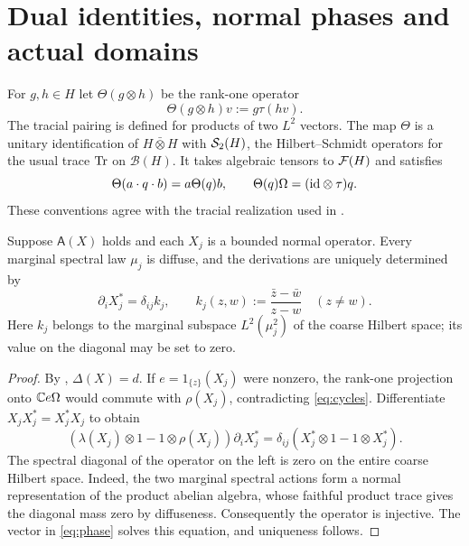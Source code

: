 \section{Dual identities, normal phases and actual domains}\label{sec:duals}
For $g,h\in H$ let $\Theta(g\otimes h)$ be the rank-one operator
\[
 \Theta(g\otimes h)v:=g\tau(hv).
\]
The tracial pairing is defined for products of two $L^2$ vectors.
The map $\Theta$ is a unitary identification of $H\bar\otimes H$ with $\mathcal S_2(H)$, the Hilbert--Schmidt operators for the usual trace $\operatorname{Tr}$ on $\mathcal B(H)$.
It takes algebraic tensors to $\mathcal F(H)$ and satisfies
\begin{equation}\label{eq:theta}
 \Theta(a\cdot q\cdot b)=a\Theta(q)b,\qquad
 \Theta(q)\Omega=(\mathrm{id}\otimes\tau)q.
\end{equation}
These conventions agree with the tracial realization used in \cite{Voi98,ACSY24}.

\begin{lemma}\label{lem:phase}
Suppose $\mathsf A(X)$ holds and each $X_j$ is a bounded normal operator.
Every marginal spectral law $\mu_j$ is diffuse, and the derivations are uniquely determined by
\begin{equation}\label{eq:phase}
 \partial_iX_j^*=\delta_{ij}k_j,\qquad
 k_j(z,w):=\frac{\bar z-\bar w}{z-w}\quad(z\ne w).
\end{equation}
Here $k_j$ belongs to the marginal subspace $L^2(\mu_j^2)$ of the coarse Hilbert space; its value on the diagonal may be set to zero.
\end{lemma}
\begin{proof}
By \cite[Proposition~3.5]{ACSY24}, $\Delta(X)=d$.
If $e=1_{\{z\}}(X_j)$ were nonzero, the rank-one projection onto $\mathbb C e\Omega$ would commute with $\rho(X_j)$, contradicting \eqref{eq:cycles}.
Differentiate $X_jX_j^*=X_j^*X_j$ to obtain
\[
 (\lambda(X_j)\otimes1-1\otimes\rho(X_j))\partial_iX_j^*
 =\delta_{ij}(X_j^*\otimes1-1\otimes X_j^*).
\]
The spectral diagonal of the operator on the left is zero on the entire coarse Hilbert space.
Indeed, the two marginal spectral actions form a normal representation of the product abelian algebra, whose faithful product trace gives the diagonal mass zero by diffuseness.
Consequently the operator is injective.
The vector in \eqref{eq:phase} solves this equation, and uniqueness follows.
\end{proof}

